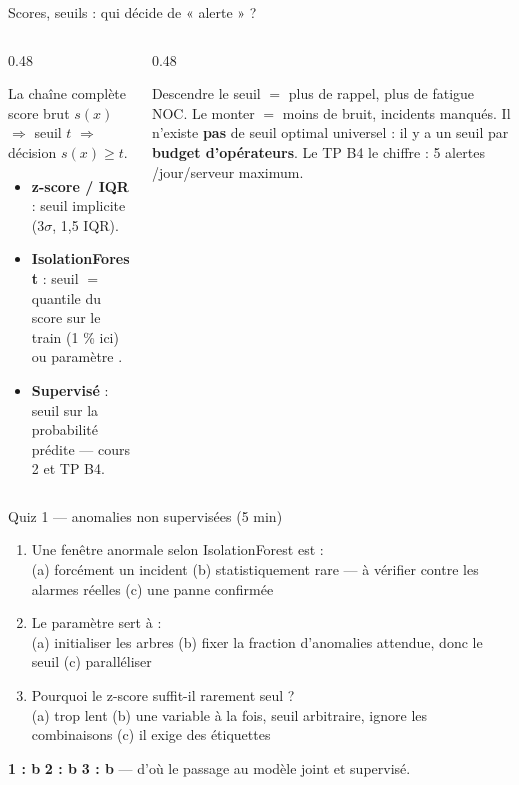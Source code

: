 \begin{frame}{Scores, seuils : qui décide de « alerte » ?}
\begin{columns}[t]
\begin{column}{0.48\textwidth}
\begin{block}{La chaîne complète}
score brut $s(x)$ $\Rightarrow$ seuil $t$ $\Rightarrow$ décision
$s(x) \ge t$.
\begin{itemize}
\item \textbf{z-score / IQR} : seuil implicite (3$\sigma$, 1,5 IQR).
\item \textbf{IsolationForest} : seuil $=$ quantile du score sur le
train (1 \% ici) ou paramètre .
\item \textbf{Supervisé} : seuil sur la probabilité prédite ---
cours 2 et TP B4.
\end{itemize}
\end{block}
\end{column}
\begin{column}{0.48\textwidth}
\begin{kbox}
Descendre le seuil $=$ plus de rappel, plus de fatigue NOC.
Le monter $=$ moins de bruit, incidents manqués.
Il n'existe \textbf{pas} de seuil optimal universel : il y a un seuil
par \textbf{budget d'opérateurs}. Le TP B4 le chiffre : 5 alertes
/jour/serveur maximum.
\end{kbox}
\end{column}
\end{columns}
\end{frame}

\begin{frame}{Quiz 1 --- anomalies non supervisées (5 min)}
\begin{qbox}[3 questions]
\begin{enumerate}
\item Une fenêtre anormale selon IsolationForest est :\\
(a) forcément un incident \quad (b) statistiquement rare --- à vérifier
contre les alarmes réelles \quad (c) une panne confirmée
\item Le paramètre  sert à :\\
(a) initialiser les arbres \quad (b) fixer la fraction d'anomalies
attendue, donc le seuil \quad (c) paralléliser
\item Pourquoi le z-score suffit-il rarement seul ?\\
(a) trop lent \quad (b) une variable à la fois, seuil arbitraire,
ignore les combinaisons \quad (c) il exige des étiquettes
\end{enumerate}
\end{qbox}
\vspace{1mm}
\begin{solbox}[Réponses]
\textbf{1 : b} \quad \textbf{2 : b} \quad \textbf{3 : b} --- d'où le
passage au modèle joint et supervisé.
\end{solbox}
\end{frame}

